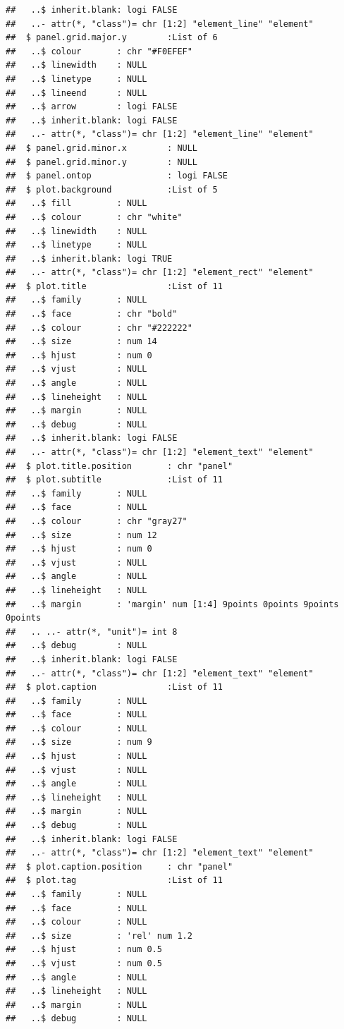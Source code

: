 \documentclass[12pt,preprint, authoryear]{elsarticle}
\numberwithin{equation}{section}
\numberwithin{figure}{section}
\numberwithin{table}{section}
\begin{document}
\begin{verbatim}
##   ..$ inherit.blank: logi FALSE
##   ..- attr(*, "class")= chr [1:2] "element_line" "element"
##  $ panel.grid.major.y        :List of 6
##   ..$ colour       : chr "#F0EFEF"
##   ..$ linewidth    : NULL
##   ..$ linetype     : NULL
##   ..$ lineend      : NULL
##   ..$ arrow        : logi FALSE
##   ..$ inherit.blank: logi FALSE
##   ..- attr(*, "class")= chr [1:2] "element_line" "element"
##  $ panel.grid.minor.x        : NULL
##  $ panel.grid.minor.y        : NULL
##  $ panel.ontop               : logi FALSE
##  $ plot.background           :List of 5
##   ..$ fill         : NULL
##   ..$ colour       : chr "white"
##   ..$ linewidth    : NULL
##   ..$ linetype     : NULL
##   ..$ inherit.blank: logi TRUE
##   ..- attr(*, "class")= chr [1:2] "element_rect" "element"
##  $ plot.title                :List of 11
##   ..$ family       : NULL
##   ..$ face         : chr "bold"
##   ..$ colour       : chr "#222222"
##   ..$ size         : num 14
##   ..$ hjust        : num 0
##   ..$ vjust        : NULL
##   ..$ angle        : NULL
##   ..$ lineheight   : NULL
##   ..$ margin       : NULL
##   ..$ debug        : NULL
##   ..$ inherit.blank: logi FALSE
##   ..- attr(*, "class")= chr [1:2] "element_text" "element"
##  $ plot.title.position       : chr "panel"
##  $ plot.subtitle             :List of 11
##   ..$ family       : NULL
##   ..$ face         : NULL
##   ..$ colour       : chr "gray27"
##   ..$ size         : num 12
##   ..$ hjust        : num 0
##   ..$ vjust        : NULL
##   ..$ angle        : NULL
##   ..$ lineheight   : NULL
##   ..$ margin       : 'margin' num [1:4] 9points 0points 9points 0points
##   .. ..- attr(*, "unit")= int 8
##   ..$ debug        : NULL
##   ..$ inherit.blank: logi FALSE
##   ..- attr(*, "class")= chr [1:2] "element_text" "element"
##  $ plot.caption              :List of 11
##   ..$ family       : NULL
##   ..$ face         : NULL
##   ..$ colour       : NULL
##   ..$ size         : num 9
##   ..$ hjust        : NULL
##   ..$ vjust        : NULL
##   ..$ angle        : NULL
##   ..$ lineheight   : NULL
##   ..$ margin       : NULL
##   ..$ debug        : NULL
##   ..$ inherit.blank: logi FALSE
##   ..- attr(*, "class")= chr [1:2] "element_text" "element"
##  $ plot.caption.position     : chr "panel"
##  $ plot.tag                  :List of 11
##   ..$ family       : NULL
##   ..$ face         : NULL
##   ..$ colour       : NULL
##   ..$ size         : 'rel' num 1.2
##   ..$ hjust        : num 0.5
##   ..$ vjust        : num 0.5
##   ..$ angle        : NULL
##   ..$ lineheight   : NULL
##   ..$ margin       : NULL
##   ..$ debug        : NULL

\end{verbatim}
\end{document}
